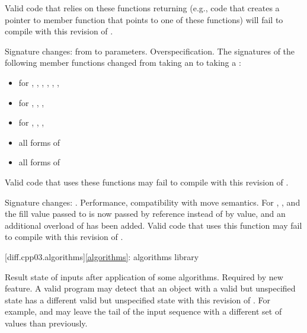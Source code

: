 Valid \CppIII{} code that relies on these functions returning 
(e.g., code that creates a pointer to member function that points to one
of these functions) will fail to compile with this revision of \Cpp{}.

\change
Signature changes: from  to 
parameters.
\rationale
Overspecification.
\effect
The signatures of the following member functions changed from taking an
 to taking a :

\begin{itemize}
\item {} for , , ,
, , , 
\item {} for , , ,
\item {} for , , , 
\item all forms of 
\item all forms of 
\end{itemize}

Valid \CppIII{} code that uses these functions may fail to compile with this
revision of \Cpp{}.

\change
Signature changes: .
\rationale
Performance, compatibility with move semantics.
\effect
For , , and 
the fill value passed to  is now passed by reference instead of
by value, and an additional overload of  has been added. Valid
\CppIII{} code that uses this function may fail to compile with this revision of \Cpp{}.

[diff.cpp03.algorithms]{\ref*{algorithms}: algorithms library}

\change
Result state of inputs after application of some algorithms.
\rationale
Required by new feature.
\effect
A valid \CppIII{} program may detect that an object with a valid but
unspecified state has a different valid but unspecified state with this
revision of \Cpp{}. For example,  and
 may leave the tail of the input sequence with a
different set of values than previously.

